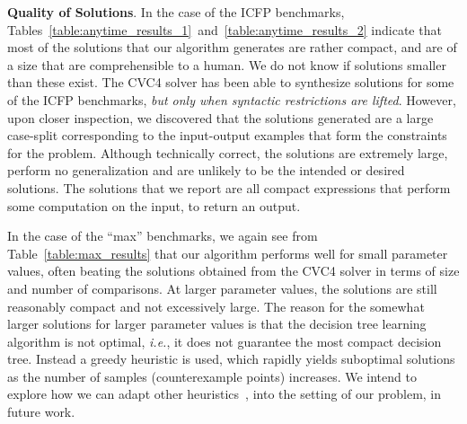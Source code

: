 \documentclass{llncs}
\newcommand{\ie}{\emph{i.e.}}
\newcommand{\dcsolve}{{\sffamily\fontsize{8.5}{10}\selectfont
    DCSolve}\xspace}
\renewcommand{\paragraph}[1]{\par\noindent\textbf{#1}.}
\begin{document}

\paragraph{Quality of Solutions}
In the case of the ICFP benchmarks,
Tables~\ref{table:anytime_results_1}~and~\ref{table:anytime_results_2}
indicate that most of the solutions that our algorithm generates are
rather compact, and are of a size that are comprehensible to a
human. We do not know if solutions smaller than these exist. The CVC4
solver has been able to synthesize solutions for some of the ICFP
benchmarks, {\em but only when syntactic restrictions are lifted}. However,
upon closer inspection, we discovered that the solutions generated are a
large case-split corresponding to the input-output examples that form
the constraints for the problem. Although technically correct, the
solutions are extremely large, perform no generalization and are
unlikely to be the intended or desired solutions.
The solutions that we report are all compact expressions that perform some
computation on the input, to return an output.

In the case of the ``max'' benchmarks, we again see from
Table~\ref{table:max_results} that our algorithm performs well for
small parameter values, often beating the solutions obtained from the
CVC4 solver in terms of size and number of comparisons.
At larger parameter values, the solutions are still reasonably compact
and not excessively large.
The reason for the somewhat larger solutions for
larger parameter values is that the decision tree learning algorithm
is not optimal, \ie, it does not guarantee the most compact decision
tree. Instead a greedy heuristic is used, which rapidly yields
suboptimal solutions as the number of samples (counterexample points)
increases.
We intend to explore how we can adapt other
heuristics~\cite{madhusudan-16-pw}, into the setting of our problem, in
future work.
\end{document}

